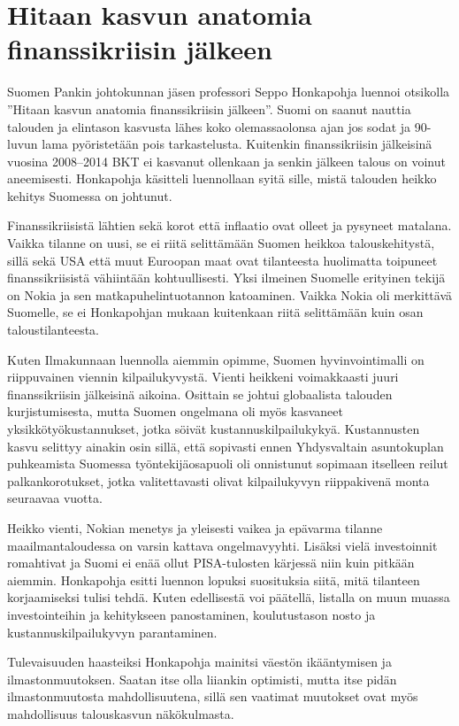 \documentclass[12pt]{article}
\begin{document}
\newpage
\section{Hitaan kasvun anatomia finanssikriisin jäl\-keen}

Suomen Pankin johtokunnan jäsen professori Seppo Honkapohja luennoi otsikolla ''Hitaan kasvun anatomia finanssikriisin jälkeen''. Suomi on saanut nauttia talouden ja elintason kasvusta lähes koko olemassaolonsa ajan jos sodat ja 90-luvun lama pyöristetään pois tarkastelusta. Kuitenkin finanssikriisin jälkeisinä vuosina 2008--2014 BKT ei kasvanut ollenkaan ja senkin jälkeen talous on voinut aneemisesti. Honkapohja käsitteli luennollaan syitä sille, mistä talouden heikko kehitys Suomessa on johtunut.

Finanssikriisistä lähtien sekä korot että inflaatio ovat olleet ja pysyneet matalana. Vaikka tilanne on uusi, se ei riitä selittämään Suomen heikkoa talouskehitystä, sillä sekä USA että muut Euroopan maat ovat tilanteesta huolimatta toipuneet finanssikriisistä vähiintään kohtuullisesti. Yksi ilmeinen Suomelle erityinen tekijä on Nokia ja sen matkapuhelintuotannon katoaminen. Vaikka Nokia oli merkittävä Suomelle, se ei Honkapohjan mukaan kuitenkaan riitä selittämään kuin osan taloustilanteesta.

Kuten Ilmakunnaan luennolla aiemmin opimme, Suomen hyvinvointimalli on riippuvainen viennin kilpailukyvystä. Vienti heikkeni voimakkaasti juuri finanssikriisin jälkeisinä aikoina. Osittain se johtui globaalista talouden kurjistumisesta, mutta Suomen ongelmana oli myös kasvaneet yksikkötyökustannukset, jotka söivät kustannuskilpailukykyä. Kustannusten kasvu selittyy ainakin osin sillä, että sopivasti ennen Yhdysvaltain asuntokuplan puhkeamista Suomessa työntekijäosapuoli oli onnistunut sopimaan itselleen reilut palkankorotukset, jotka valitettavasti olivat kilpailukyvyn riippakivenä monta seuraavaa vuotta.

Heikko vienti, Nokian menetys ja yleisesti vaikea ja epävarma tilanne maailmantaloudessa on varsin kattava ongelmavyyhti. Lisäksi vielä investoinnit romahtivat ja Suomi ei enää ollut PISA-tulosten kärjessä niin kuin pitkään aiemmin. Honkapohja esitti luennon lopuksi suosituksia siitä, mitä tilanteen korjaamiseksi tulisi tehdä. Kuten edellisestä voi päätellä, listalla on muun muassa investointeihin ja kehitykseen panostaminen, koulutustason nosto ja kustannuskilpailukyvyn parantaminen.

Tulevaisuuden haasteiksi Honkapohja mainitsi väestön ikääntymisen ja ilmastonmuutoksen. Saatan itse olla liiankin optimisti, mutta itse pidän ilmastonmuutosta mahdollisuutena, sillä sen vaatimat muutokset ovat myös mahdollisuus talouskasvun näkökulmasta.
\end{document}

